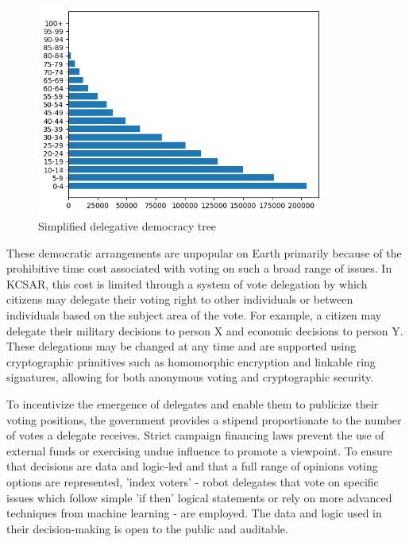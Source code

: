 \documentclass[fleqn,10pt]{Stylesheet} %
\begin{document}
\begin{figure}
    \centering
    \includegraphics[width=95mm]{figures/fig_demopyr_t.png}
    \caption{Simplified delegative democracy tree}
\end{figure}

These democratic arrangements are unpopular on Earth primarily because of the prohibitive time cost associated with voting on such a broad range of issues. In KCSAR, this cost is limited through a system of vote delegation by which citizens may delegate their voting right to other individuals or between individuals based on the subject area of the vote. For example, a citizen may delegate their military decisions to person X and economic decisions to person Y. These delegations may be changed at any time and are supported using cryptographic primitives such as homomorphic encryption and linkable ring signatures, allowing for both anonymous voting and cryptographic security.

To incentivize the emergence of delegates and enable them to publicize their voting positions, the government provides a stipend proportionate to the number of votes a delegate receives. Strict campaign financing laws prevent the use of external funds or exercising undue influence to promote a viewpoint. To ensure that decisions are data and logic-led and that a full range of opinions voting options are represented, 'index voters' - robot delegates that vote on specific issues which follow simple 'if then' logical statements or rely on more advanced techniques from machine learning - are employed. The data and logic used in their decision-making is open to the public and auditable.
\end{document}
